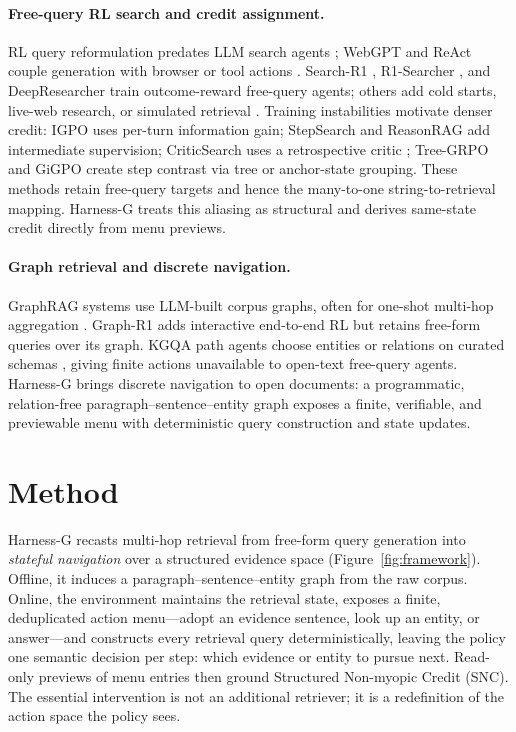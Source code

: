 \documentclass[letterpaper]{article} %
\begin{document}
\paragraph{Free-query RL search and credit assignment.}
RL query reformulation predates LLM search agents
\citep{nogueira2017query,buck2018activeqa}; WebGPT and ReAct couple
generation with browser or tool actions
\citep{nakano2021webgpt,yao2023react}.
Search-R1 \citep{jin2025searchr1}, R1-Searcher
\citep{song2025r1searcher}, and DeepResearcher
\citep{zheng2025deepresearcher} train outcome-reward free-query agents;
others add cold starts, live-web research, or simulated retrieval
\citep{chen2025research,li2025webthinker,sun2025zerosearch}.
Training instabilities \citep{wang2025ragen} motivate denser credit:
IGPO \citep{igpo2025} uses per-turn information gain;
StepSearch \citep{wang2025stepsearch} and ReasonRAG
\citep{zhang2025reasonrag} add intermediate supervision; CriticSearch
uses a retrospective critic
\citep{zhang2026criticsearch}; Tree-GRPO
\citep{treegrpo2025} and GiGPO \citep{feng2025gigpo} create step contrast
via tree or anchor-state grouping.
These methods retain free-query targets and hence the many-to-one
string-to-retrieval mapping.
Harness-G treats this aliasing as structural and derives
same-state credit directly from menu previews.

\paragraph{Graph retrieval and discrete navigation.}
GraphRAG systems use LLM-built corpus graphs, often for one-shot multi-hop aggregation \citep{edge2024graphrag,guo2024lightrag,gutierrez2024hipporag,gutierrez2025hipporag2,luo2025hypergraphrag,hou2026atomicrag}.
Graph-R1 \citep{luo2025graphr1} adds interactive end-to-end RL but retains free-form queries over its graph.
KGQA path agents choose entities or relations on curated schemas \citep{das2018minerva,sun2024tog,kgr12025,hou2025softreasoning}, giving finite actions unavailable to open-text free-query agents.
Harness-G brings discrete navigation to open documents: a programmatic, relation-free paragraph--sentence--entity graph exposes a finite, verifiable, and previewable menu with deterministic query construction and state updates.

\section{Method}

Harness-G recasts multi-hop retrieval from free-form query generation into \emph{stateful navigation} over a structured evidence space (Figure~\ref{fig:framework}). Offline, it induces a paragraph--sentence--entity graph from the raw corpus. Online, the environment maintains the retrieval state, exposes a finite, deduplicated action menu---adopt an evidence sentence, look up an entity, or answer---and constructs every retrieval query deterministically, leaving the policy one semantic decision per step: which evidence or entity to pursue next. Read-only previews of menu entries then ground Structured Non-myopic Credit (SNC). The essential intervention is not an additional retriever; it is a redefinition of the action space the policy sees.
\end{document}
